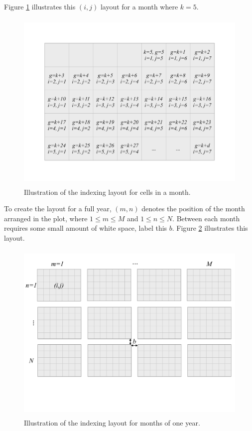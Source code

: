 \documentclass[article]{jss}
\begin{document}
Figure \ref{fig:month-diagram} illustrates this \((i,j)\) layout for a
month where \(k=5\).

\begin{CodeChunk}
\begin{figure}

{\centering \includegraphics[width=360pt,height=250pt]{figure/month} 

}

\caption[Illustration of the indexing layout for cells in a month]{Illustration of the indexing layout for cells in a month.}\label{fig:month-diagram}
\end{figure}
\end{CodeChunk}

To create the layout for a full year, \((m, n)\) denotes the position of
the month arranged in the plot, where \(1 \le m \le M\) and
\(1 \le n \le N\). Between each month requires some small amount of
white space, label this \(b\). Figure \ref{fig:year-diagram} illustrates
this layout.

\begin{CodeChunk}
\begin{figure}

{\centering \includegraphics[width=360pt,height=250pt]{figure/year} 

}

\caption[Illustration of the indexing layout for months of one year]{Illustration of the indexing layout for months of one year.}\label{fig:year-diagram}
\end{figure}
\end{CodeChunk}
\end{document}
